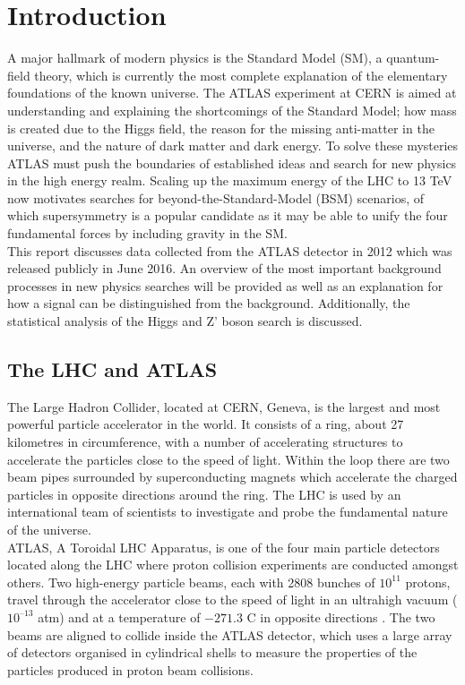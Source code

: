 \documentclass[runningheads,a4paper]{llncs}
\begin{document}
\section{Introduction}
A major hallmark of modern physics is the Standard Model (SM), a quantum-field theory, which is currently the most complete explanation of the elementary foundations of the known universe. The ATLAS experiment at CERN is aimed at understanding and explaining the shortcomings of the Standard Model; how mass is created due to the Higgs field, the reason for the missing anti-matter in the universe, and the nature of dark matter and dark energy. To solve these mysteries ATLAS must push the boundaries of established ideas and search for new physics in the high energy realm. Scaling up the maximum energy of the LHC to 13 TeV now motivates searches for beyond-the-Standard-Model (BSM) scenarios, of which supersymmetry is a popular candidate as it may be able to unify the four fundamental forces by including gravity in the SM.\\

This report discusses data collected from the ATLAS detector in 2012 which was released publicly in June 2016. An overview of the most important background processes in new physics searches will be provided as well as an explanation for how a signal can be distinguished from the background. Additionally, the statistical analysis of the Higgs and Z' boson search is discussed.\\

\subsection{The LHC and ATLAS}
The Large Hadron Collider, located at CERN, Geneva, is the largest and most powerful particle accelerator in the world. It consists of a ring, about 27 kilometres in circumference, with a number of accelerating structures to accelerate the particles close to the speed of light. Within the loop there are two beam pipes surrounded by superconducting magnets which accelerate the charged particles in opposite directions around the ring. The LHC is used by an international team of scientists to investigate and probe the fundamental nature of the universe.\\

ATLAS, A Toroidal LHC Apparatus, is one of the four main particle detectors located along the LHC where proton collision experiments are conducted amongst others. Two high-energy particle beams, each with 2808 bunches of ${10}^{11}$ protons, travel through the accelerator close to the speed of light in an ultrahigh vacuum (${10}^{–13}$ atm) and at a temperature of $-271.3$ \textdegree C in opposite directions \cite{CERN}. The two beams are aligned to collide inside the ATLAS detector, which uses a large array of detectors organised in cylindrical shells to measure the properties of the particles produced in proton beam collisions.\\
\end{document}
